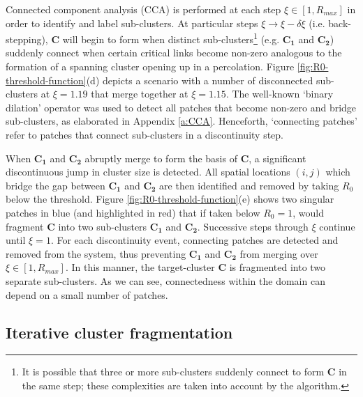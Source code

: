 Connected component analysis (CCA) is performed at each step $\xi \in [1, R_{max}]$ in order to identify and label sub-clusters. 
At particular steps $\xi \rightarrow \xi - \delta\xi$ (i.e. back-stepping), $\mathbf{C}$ will begin to form when distinct sub-clusters\footnote{
It is possible that three or more sub-clusters suddenly connect to form $\mathbf{C}$ in the same step; 
these complexities are taken into account by the algorithm.} 
 (e.g. $\mathbf{C_1}$ and $\mathbf{C_2}$) suddenly connect when certain critical links become non-zero\textemdash
analogous to the formation of a spanning cluster opening up in a percolation. 
Figure \ref{fig:R0-threshold-function}(d) depicts a scenario with a number of disconnected sub-clusters at $\xi=1.19$ that merge together at $\xi=1.15$.
The well-known `binary dilation' operator \cite{liang1989erosion, 23111, nachtegael2001connections} was used to detect all patches that become non-zero and bridge sub-clusters, as elaborated in Appendix \ref{a:CCA}.
Henceforth, `connecting patches' refer to patches that connect sub-clusters in a discontinuity step.

When $\mathbf{C_1}$ and $\mathbf{C_2}$ abruptly merge to form the basis of $\mathbf{C}$, a significant discontinuous jump in cluster size is detected. 
All spatial locations $(i,j)$ which bridge the gap between $\mathbf{C_1}$ and $\mathbf{C_2}$ are then identified and removed by taking $R_0$ below the threshold.
Figure \ref{fig:R0-threshold-function}(e) shows two singular patches in blue (and highlighted in red) that if taken below $R_0=1$,
would fragment $\mathbf{C}$ into two sub-clusters $\mathbf{C_1}$ and $\mathbf{C_2}$.
Successive steps through $\xi$ continue until $\xi=1$.
For each discontinuity event, connecting patches are detected and removed from the system,
thus preventing $\mathbf{C_1}$ and $\mathbf{C_2}$ from merging over $\xi \in [1, R_{max}]$.
In this manner, the target-cluster $\mathbf{C}$ is fragmented into two separate sub-clusters. 
As we can see, connectedness within the domain can depend on a small number of patches.

\subsection{Iterative cluster fragmentation}
\label{sec:fragmentation-method-2}

